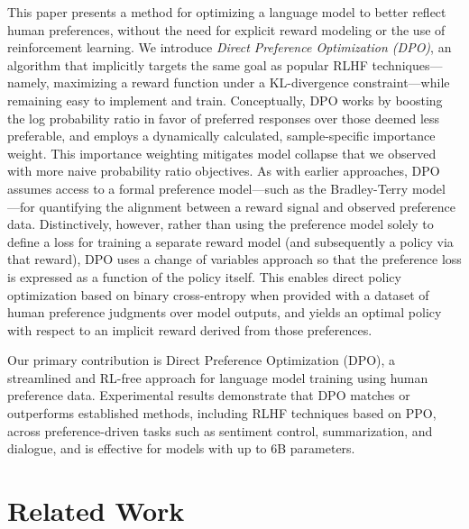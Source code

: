 This paper presents a method for optimizing a language model to better reflect human preferences, without the need for explicit reward modeling or the use of reinforcement learning. We introduce \textit{{Direct Preference Optimization} (DPO)}, an algorithm that implicitly targets the same goal as popular RLHF techniques—namely, maximizing a reward function under a KL-divergence constraint—while remaining easy to implement and train. Conceptually, DPO works by boosting the log probability ratio in favor of preferred responses over those deemed less preferable, and employs a dynamically calculated, sample-specific importance weight. This importance weighting mitigates model collapse that we observed with more naive probability ratio objectives. As with earlier approaches, DPO assumes access to a formal preference model—such as the Bradley-Terry model \cite{bradley1952rankanalysis}—for quantifying the alignment between a reward signal and observed preference data. Distinctively, however, rather than using the preference model solely to define a loss for training a separate reward model (and subsequently a policy via that reward), DPO uses a change of variables approach so that the preference loss is expressed as a function of the policy itself. This enables direct policy optimization based on binary cross-entropy when provided with a dataset of human preference judgments over model outputs, and yields an optimal policy with respect to an implicit reward derived from those preferences.

Our primary contribution is Direct Preference Optimization (DPO), a streamlined and RL-free approach for language model training using human preference data. Experimental results demonstrate that DPO matches or outperforms established methods, including RLHF techniques based on PPO, across preference-driven tasks such as sentiment control, summarization, and dialogue, and is effective for models with up to 6B parameters.

\section{Related Work}


